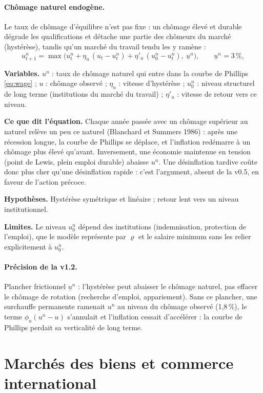 \documentclass[11pt,a4paper]{article}
\newcommand{\variables}{\par\noindent\textbf{Variables.} }
\newcommand{\sens}{\par\noindent\textbf{Ce que dit l'équation.} }
\newcommand{\hyp}{\par\noindent\textbf{Hypothèses.} }
\newcommand{\limites}{\par\noindent\textbf{Limites.} }
\begin{document}
\paragraph{Chômage naturel endogène.} Le taux de chômage d'équilibre n'est pas fixe : un chômage élevé et durable dégrade les qualifications et détache une partie des chômeurs du marché (hystérèse), tandis qu'un marché du travail tendu les y ramène :
\begin{equation}
u^n_{t+1} = \max\!\Big(u^n_t + \eta_u\,(u_t - u^n_t) + \eta'_u\,(u^n_0 - u^n_t),\ \underline u^n\Big), \qquad \underline u^n = 3\,\%,
\label{eq:un}
\end{equation}
\begin{lecture}
\variables $u^n$ : taux de chômage naturel qui entre dans la courbe de Phillips \eqref{eq:wage} ; $u$ : chômage observé ; $\eta_u$ : vitesse d'hystérèse ; $u^n_0$ : niveau structurel de long terme (institutions du marché du travail) ; $\eta'_u$ : vitesse de retour vers ce niveau.
\sens Chaque année passée avec un chômage supérieur au naturel relève un peu ce naturel (Blanchard et Summers 1986) : après une récession longue, la courbe de Phillips se déplace, et l'inflation redémarre à un chômage plus élevé qu'avant. Inversement, une économie maintenue en tension (point de Lewis, plein emploi durable) abaisse $u^n$. Une désinflation tardive coûte donc plus cher qu'une désinflation rapide : c'est l'argument, absent de la v0.5, en faveur de l'action précoce.
\hyp Hystérèse symétrique et linéaire ; retour lent vers un niveau institutionnel.
\limites Le niveau $u^n_0$ dépend des institutions (indemnisation, protection de l'emploi), que le modèle représente par $\varrho$ et le salaire minimum sans les relier explicitement à $u^n_0$.
\paragraph{Précision de la v1.2.} Plancher frictionnel $\underline u^n$ : l'hystérèse peut abaisser le chômage naturel, pas effacer le chômage de rotation (recherche d'emploi, appariement). Sans ce plancher, une surchauffe permanente ramenait $u^n$ au niveau du chômage observé (1,8\,\%), le terme $\phi_u(u^n-u)$ s'annulait et l'inflation cessait d'accélérer : la courbe de Phillips perdait sa verticalité de long terme.
\end{lecture}

\section{Marchés des biens et commerce international}
\label{sec:marches}
\end{document}
